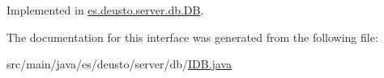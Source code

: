 Implemented in \hyperlink{classes_1_1deusto_1_1server_1_1db_1_1_d_b_ac85523faea523033439a932bbcab2c7e}{es.\+deusto.\+server.\+db.\+DB}.



The documentation for this interface was generated from the following file\+:\begin{DoxyCompactItemize}
\item 
src/main/java/es/deusto/server/db/\hyperlink{_i_d_b_8java}{I\+D\+B.\+java}\end{DoxyCompactItemize}

